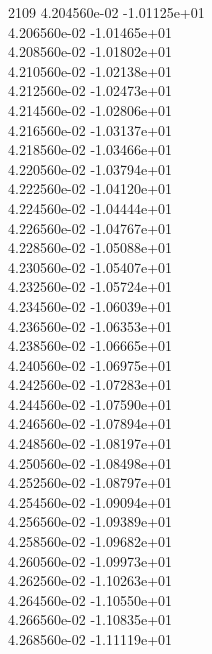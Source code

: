 2109	4.204560e-02	-1.01125e+01	\\ 	4.206560e-02	-1.01465e+01	\\ 	4.208560e-02	-1.01802e+01	\\ 	4.210560e-02	-1.02138e+01	\\ 	4.212560e-02	-1.02473e+01	\\ 	4.214560e-02	-1.02806e+01	\\ 	4.216560e-02	-1.03137e+01	\\ 	4.218560e-02	-1.03466e+01	\\ 	4.220560e-02	-1.03794e+01	\\ 	4.222560e-02	-1.04120e+01	\\ 	4.224560e-02	-1.04444e+01	\\ 	4.226560e-02	-1.04767e+01	\\ 	4.228560e-02	-1.05088e+01	\\ 	4.230560e-02	-1.05407e+01	\\ 	4.232560e-02	-1.05724e+01	\\ 	4.234560e-02	-1.06039e+01	\\ 	4.236560e-02	-1.06353e+01	\\ 	4.238560e-02	-1.06665e+01	\\ 	4.240560e-02	-1.06975e+01	\\ 	4.242560e-02	-1.07283e+01	\\ 	4.244560e-02	-1.07590e+01	\\ 	4.246560e-02	-1.07894e+01	\\ 	4.248560e-02	-1.08197e+01	\\ 	4.250560e-02	-1.08498e+01	\\ 	4.252560e-02	-1.08797e+01	\\ 	4.254560e-02	-1.09094e+01	\\ 	4.256560e-02	-1.09389e+01	\\ 	4.258560e-02	-1.09682e+01	\\ 	4.260560e-02	-1.09973e+01	\\ 	4.262560e-02	-1.10263e+01	\\ 	4.264560e-02	-1.10550e+01	\\ 	4.266560e-02	-1.10835e+01	\\ 	4.268560e-02	-1.11119e+01	\\ \hline
